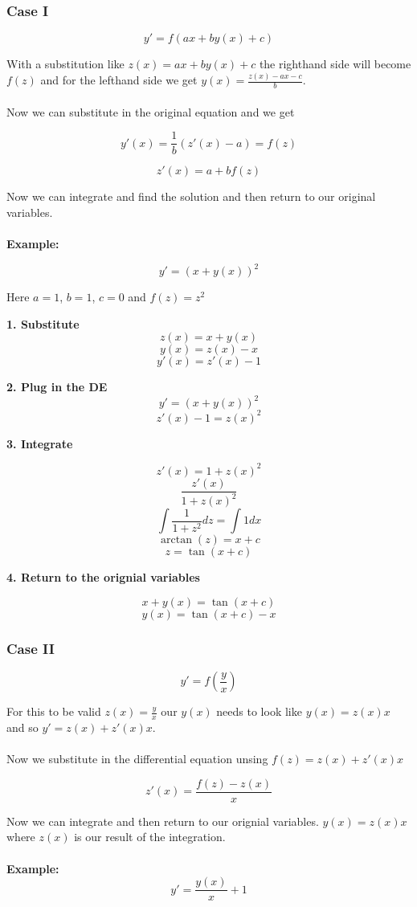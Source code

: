 \subsubsection{Case I}

\[y' = f(ax + by(x) + c)\]

With a substitution like \(z(x) = ax + by(x) + c\) the righthand side will become \(f(z)\)
and for the lefthand side we get \(y(x) = \frac{z(x) - ax - c}{b}\).
\\\\
Now we can substitute in the original equation and we get

\[y'(x) = \frac{1}{b} (z'(x) - a) = f(z)\]

\[z'(x) = a + b f(z)\]

Now we can integrate and find the solution and then return to our original variables.
\\\\
\textbf{Example:}

\[y' = (x + y(x))^2\]

Here \(a = 1\), \(b = 1\), \(c = 0\) and \(f(z) = z^2\)

\textbf{1. Substitute}
\[
z(x) = x + y(x)
\]
\[y(x) = z(x) - x\]
\[y'(x) = z'(x) - 1\]

\textbf{2. Plug in the DE}
\[y' = (x + y(x))^2\]
\[z'(x) - 1 = z(x)^2\]

\textbf{3. Integrate}

\[z'(x) = 1 + z(x)^2\]
\[\frac{z'(x)}{1 + z(x)^2}\]
\[\int \frac{1}{1 + z^2} dz = \int 1 dx\]
\[\arctan (z) = x + c\]
\[z = \tan(x + c)\]

\textbf{4. Return to the orignial variables}

\[x + y(x) = \tan(x + c)\]
\[y(x) = \tan(x + c) - x\]

\subsubsection{Case II}

\[y' = f(\frac{y}{x})\]

For this to be valid \(z(x) = \frac{y}{x}\) our \(y(x)\) needs to look like \(y(x) = z(x)x\) and so \(y' = z(x) + z'(x)x\).
\\\\
Now we substitute in the differential equation unsing \(f(z) = z(x) + z'(x)x\)

\[
z'(x) = \frac{f(z) - z(x)}{x}
\]

Now we can integrate and then return to our orignial variables. \(y(x) = z(x) x\) where \(z(x)\) is our
result of the integration.
\\\\
\textbf{Example:}
\[y' = \frac{y(x)}{x} + 1\]

